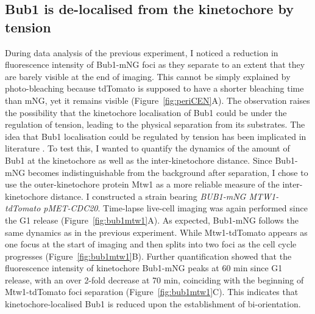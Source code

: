 \subsection{Bub1 is de-localised from the kinetochore by tension}
During data analysis of the previous experiment, I noticed a reduction in fluorescence intensity of Bub1-mNG foci as they separate to an extent that they are barely visible at the end of imaging. This cannot be simply explained by photo-bleaching because tdTomato is supposed to have a shorter bleaching time than mNG, yet it remains visible (Figure~\ref{fig:periCEN}A). The observation raises the possibility that the kinetochore localisation of Bub1 could be under the regulation of tension, leading to the physical separation from its substrates. The idea that Bub1 localisation could be regulated by tension has been implicated in literature \citep{Asai2020, Proudfoot2019, Jin2017PrematureCerevisiae}. To test this, I wanted to quantify the dynamics of the amount of Bub1 at the kinetochore as well as the inter-kinetochore distance. Since Bub1-mNG becomes indistinguishable from the background after separation, I chose to use the outer-kinetochore protein Mtw1 as a more reliable measure of the inter-kinetochore distance. I constructed a strain bearing \textit{BUB1-mNG MTW1-tdTomato pMET-CDC20}. Time-lapse live-cell imaging was again performed since the G1 release (Figure~\ref{fig:bub1mtw1}A). As expected, Bub1-mNG follows the same dynamics as in the previous experiment. While Mtw1-tdTomato appears as one focus at the start of imaging and then splits into two foci as the cell cycle progresses (Figure~\ref{fig:bub1mtw1}B). Further quantification showed that the fluorescence intensity of kinetochore Bub1-mNG peaks at 60 \si{\minute} since G1 release, with an over 2-fold decrease at 70 \si{\minute}, coinciding with the beginning of Mtw1-tdTomato foci separation (Figure~\ref{fig:bub1mtw1}C). This indicates that kinetochore-localised Bub1 is reduced upon the establishment of bi-orientation. 

